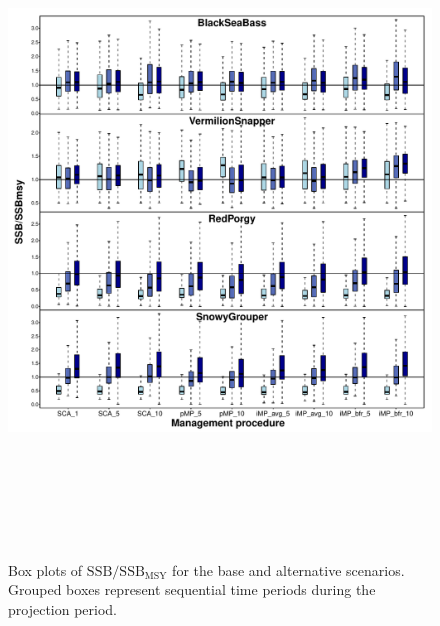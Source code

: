 \documentclass[12pt,english]{article}
\begin{document}
\begin{figure}[!ht]
\begin{center}
\includegraphics[width=6in,height=7in]{../Figs/boxplotSBSBMSY1.pdf}
\end{center}
\begin{flushleft}
\caption{Box plots of $\mathrm{SSB/SSB_{MSY}}$ for the base and alternative scenarios. Grouped boxes represent sequential time periods during the projection period.}
\label{fig:boxplotSBSBMSY1}
\end{flushleft}
\end{figure}
\end{document}
